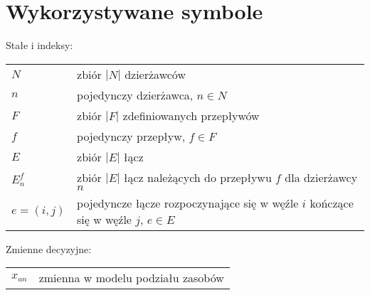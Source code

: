 \section{Wykorzystywane symbole}

Stałe i indeksy:
\begin{tabular}{l l}
$N$ & zbiór $|N|$ dzierżawców \\
$n$ & pojedynczy dzierżawca, $n \in N$ \\
$F$ & zbiór $|F|$ zdefiniowanych przepływów \\
$f$ & pojedynczy przepływ, $f \in F$ \\
$E$ & zbiór $|E|$ łącz \\
$E^f_n$ & zbiór $|E|$ łącz należących do przepływu $f$ dla dzierżawcy $n$\\
$e = (i,j)$ & pojedyncze łącze rozpoczynające się w węźle $i$ kończące się w węźle $j$, $e \in E$ \\
\end{tabular}

Zmienne decyzyjne:
\begin{tabular}{l l}
$x_{an}$ & zmienna w modelu podziału zasobów \\
\end{tabular}

